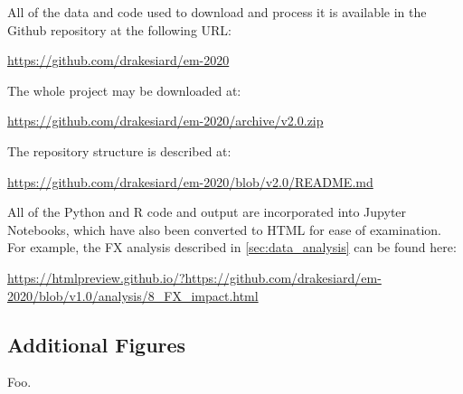 \documentclass[12pt,a4paper]{article}
\begin{document}
All of the data and code used to download and process it is available in the Github repository at the following URL:

\url{https://github.com/drakesiard/em-2020}

\noindent
The whole project may be downloaded at:

\url{https://github.com/drakesiard/em-2020/archive/v2.0.zip}

\noindent
The repository structure is described at:

\url{https://github.com/drakesiard/em-2020/blob/v2.0/README.md}

\noindent
All of the Python and R code and output are incorporated into Jupyter Notebooks, which have also been converted to HTML for ease of examination. For example, the FX analysis described in \cref{sec:data_analysis} can be found here:

\begin{adjustbox}{max width=\textwidth}
\url{https://htmlpreview.github.io/?https://github.com/drakesiard/em-2020/blob/v1.0/analysis/8_FX_impact.html}
\end{adjustbox}

\clearpage
\subsection{Additional Figures}\label{sec:graph_appendix}
Foo.
\end{document}
